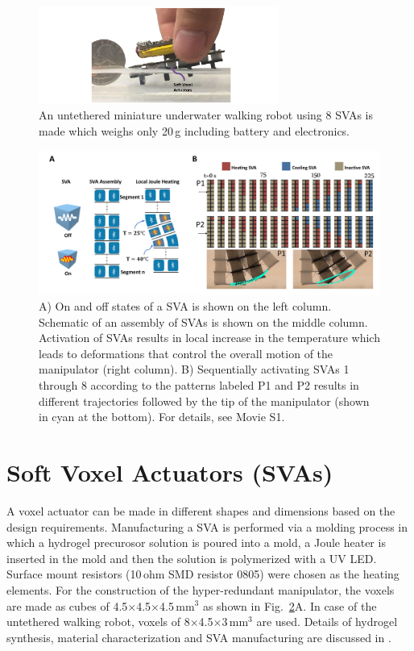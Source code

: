 \begin{figure}[!t]
\centering
\includegraphics[width=0.7\textwidth]{Fig1.pdf}
    \caption[Untethered miniature underwater walking robot]{An untethered miniature underwater walking robot using 8 SVAs is made which weighs only 20\,g including battery and electronics.}
    \label{fig:concept}
\end{figure}
\begin{figure}[!t]
      \centering
      \includegraphics[width=\textwidth]{Fig2.pdf}
      \caption[Trajectory control in a miniature hyper-redundant arm]{A) On and off states of a SVA is shown on the left column. Schematic of an assembly of SVAs is shown on the middle column. Activation of SVAs results in local increase in the temperature which leads to deformations that control the overall motion of the manipulator (right column). B) Sequentially activating SVAs 1 through 8 according to the patterns labeled P1 and P2 results in different trajectories followed by the tip of the manipulator (shown in cyan at the bottom). For details, see Movie S1.}
      \label{fig:treajectory}
   \end{figure}
	
\section{Soft Voxel Actuators (SVAs)}
A voxel actuator can be made in different shapes and dimensions based on the design requirements. Manufacturing a SVA is performed via a molding process in which a hydrogel precurosor solution is poured into a mold, a Joule heater is inserted in the mold and then the solution is polymerized with a UV LED. Surface  mount  resistors  (10\,ohm  SMD  resistor  0805) were chosen as the heating elements. For the construction of the hyper-redundant manipulator, the voxels are made as cubes of 4.5$\times$4.5$\times$4.5\,mm$^3$ as shown in Fig.~\ref{fig:treajectory}A. In case of the untethered walking robot, voxels of 8$\times$4.5$\times$3\,mm$^3$ are used. Details of hydrogel synthesis, material characterization and SVA manufacturing are discussed in \cite{Khodambashi2021}.


